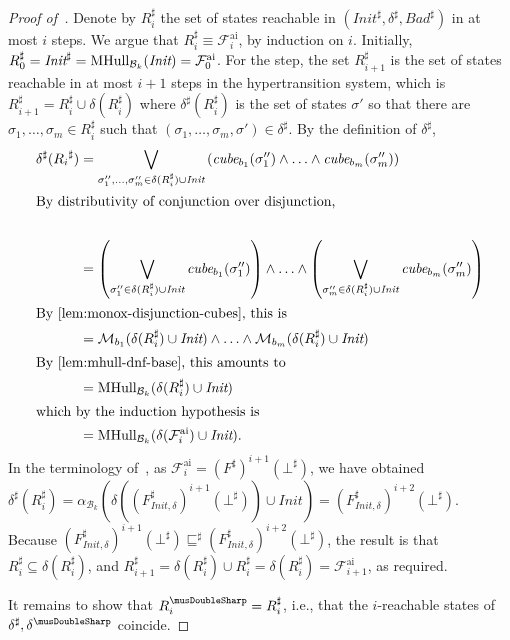\documentclass[acmsmall,screen]{acmart}
\newcommand{\Init}{{\textit{Init}}}
\newcommand{\tr}{\delta}
\newcommand{\Frameai}{\mathcal{F}^{\text{ai}}}
\newcommand{\bkwrch}[1]{\mathcal{B}_{#1}}
\newcommand{\sleq}{\sqsubseteq}
\newcommand{\cubemon}[2]{\textit{cube}_{{#2}}({#1})}
\newcommand{\monox}[2]{\mathcal{M}_{#2}({#1})}
\newcommand{\mhull}[2]{{\rm MHull}_{#2}({#1})}
\newcommand{\abs}[1]{{#1}^{\sharp}}
\newcommand{\absr}[1]{{#1}^{\musDoubleSharp}}
\newcommand{\malpha}[1]{\alpha_{#1}}
\newcommand{\bkcube}{b}
\begin{document}
{\begin{proof}[Proof of~]
Denote by $\abs{R}_i$ the set of states reachable in $(\abs{\Init},\abs{\tr},\abs{Bad})$ in at most $i$ steps.
We argue that $\abs{R}_i \equiv \Frameai_{i}$,
by induction on $i$.
Initially, $\abs{R}_0 = \abs{\Init} = \mhull{\Init}{\bkwrch{k}} = \Frameai_0$.
For the step, the set $\abs{R}_{i+1}$ is the set of states reachable in at most $i+1$ steps in the hypertransition system, which is $\abs{R}_{i+1} = \abs{R}_i \cup \tr(\abs{R}_i)$ where $\abs{\tr}(\abs{R}_i)$ is the set of states $\sigma'$ so that there are $\sigma_1,\ldots,\sigma_m \in \abs{R}_i$ such that $(\sigma_1,\ldots,\sigma_m,\sigma') \in \abs{\tr}$. By the definition of $\abs{\tr}$,
\begin{align*}
	{\abs{\tr}}({\abs{R_i}})
	&= \bigvee_{\sigma''_1,\ldots,\sigma''_m \in {\tr}({\abs{R}_i}) \cup \Init}{\left(\cubemon{\sigma''_1}{\bkcube_1} \land \ldots \land \cubemon{\sigma''_m}{\bkcube_m}\right)}
	\\
	\intertext{By distributivity of conjunction over disjunction,}
	\\
	&= \left(\bigvee_{\sigma''_1 \in {\tr}({\abs{R}_i}) \cup \Init}{\cubemon{\sigma''_1}{\bkcube_1}}\right)
		\land
		\ldots
		\land
		\left(\bigvee_{\sigma''_m \in {\tr}({\abs{R}_i}) \cup \Init}{\cubemon{\sigma''_m}{\bkcube_m}}
		\right)
	\\
	\intertext{By~\Cref{lem:monox-disjunction-cubes}, this is}
	&= \monox{{\tr}({\abs{R}_i}) \cup \Init}{\bkcube_1} \land \ldots \land \monox{{\tr}({\abs{R}_i}) \cup \Init}{\bkcube_m}
	\\
	\intertext{By~\Cref{lem:mhull-dnf-base}, this amounts to}
	&= \mhull{{\tr}({\abs{R}_i}) \cup \Init}{\bkwrch{k}}
	\\
	\intertext{which by the induction hypothesis is}
	&= \mhull{{\tr}({\Frameai_{i}}) \cup \Init}{\bkwrch{k}}.
\end{align*}
In the terminology of~, as $\Frameai_{i}=(\abs{F})^{i+1}(\abs{\bot})$, we have obtained $\abs{\tr}(\abs{R}_i)=\malpha{\bkwrch{k}}(\tr(({\abs{F}_{\Init,\tr}})^{i+1}(\abs{\bot}))\cup \Init)=(\abs{F}_{\Init,\tr})^{i+2}(\abs{\bot})$. Because
$(\abs{F}_{\Init,\tr})^{i+1}(\abs{\bot}) \abs{\sleq} (\abs{F}_{\Init,\tr})^{i+2}(\abs{\bot})$,
%
the result is that $\abs{R}_i \subseteq \tr(\abs{R}_i)$, and
$\abs{R}_{i+1} = \tr(\abs{R}_i) \cup \abs{R}_i = \tr(\abs{R}_i) = \Frameai_{i+1}$, as required.

It remains to show that $\absr{R}_i = \abs{R}_i$, i.e., that the $i$-reachable states of $\abs{\tr},\absr{\tr}$ coincide.


\end{proof}}
\end{document}
